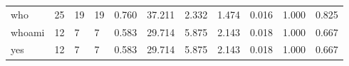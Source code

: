 \begin{longtable}{lp{1.8cm}p{1.8cm}p{1.8cm}p{1.8cm}p{1.8cm}p{1.8cm}p{1.8cm}p{1.8cm}p{1.8cm}p{1.8cm}}
who       &                           25 &                 19 &                                19 &                                      0.760 &                                 37.211 &                                        2.332 &                             1.474 &                                   0.016 &                              1.000 &                                              0.825 \\
whoami    &                           12 &                  7 &                                 7 &                                      0.583 &                                 29.714 &                                        5.875 &                             2.143 &                                   0.018 &                              1.000 &                                              0.667 \\
yes       &                           12 &                  7 &                                 7 &                                      0.583 &                                 29.714 &                                        5.875 &                             2.143 &                                   0.018 &                              1.000 &                                              0.667 \\
\end{longtable}
